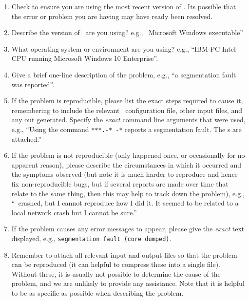 \begin{enumerate}

\item Check to ensure you are using the most recent version of \CNAME. Its possible that the error or problem you are having may have ready been resolved. 

\item Describe the version of \CNAME\ are you using? e.g., \CNAME\ \VER Microsoft Windows executable''

\item What operating system or environment are you using? e.g., ``IBM-PC Intel CPU running Microsoft Windows 10 Enterprise''.

\item Give a brief one-line description of the problem, e.g., ``a segmentation fault was reported''.

\item If the problem is reproducible, please list the exact steps required to cause it, remembering to include the relevant \CNAME\ configuration file, other input files, and any out generated. Specify the \emph{exact} command line arguments that were used, e.g., ``Using the command \texttt{***.-* -*} reports a segmentation fault. The \config s are attached.''

\item If the problem is not reproducible (only happened once, or occasionally for no apparent reason), please describe the circumstances in which it occurred and the symptoms observed (but note it is much harder to reproduce and hence fix non-reproducible bugs, but if several reports are made over time that relate to the same thing, then this may help to track down the problem), e.g., ``\CNAME\ crashed, but I cannot reproduce how I did it. It seemed to be related to a local network crash but I cannot be sure.''

\item If the problem causes any error messages to appear, please give the \emph{exact} text displayed, e.g., \texttt{segmentation fault (core dumped)}.

\item Remember to attach all relevant input and output files so that the problem can be reproduced (it can helpful to compress these into a single file). Without these, it is usually not possible to determine the cause of the problem, and we are unlikely to provide any assistance. Note that it is helpful to be as specific as possible when describing the problem.

\end{enumerate}
